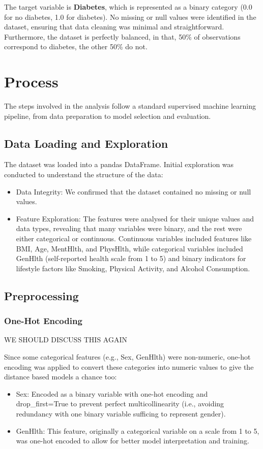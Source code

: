 \documentclass[a4paper,12pt]{article}
\begin{document}
The target variable is \textbf{Diabetes}, which is represented as a binary category 
(0.0 for no diabetes, 1.0 for diabetes). No missing or null values were identified in the dataset, 
ensuring that data cleaning was minimal and straightforward. Furthermore, the dataset is perfectly 
balanced, in that, 50\% of observations correspond to diabetes, the other 50\% do not.



\section{Process}
The steps involved in the analysis follow a standard supervised machine learning pipeline, 
from data preparation to model selection and evaluation.

\subsection{Data Loading and Exploration}
The dataset was loaded into a pandas DataFrame. Initial exploration was conducted to understand 
the structure of the data:
\begin{itemize}
    \item Data Integrity: We confirmed that the dataset contained no missing or null values.
    \item Feature Exploration: The features were analysed for their unique values and data 
    types, revealing that many variables were binary, and the rest were either categorical or 
    continuous. Continuous variables included features like BMI, Age, MentHlth, and PhysHlth, 
    while categorical variables included GenHlth (self-reported health scale from 1 to 5) 
    and binary indicators for lifestyle factors like Smoking, Physical Activity, and Alcohol 
    Consumption.
\end{itemize}

\subsection{Preprocessing}
\subsubsection{One-Hot Encoding}
WE SHOULD DISCUSS THIS AGAIN

Since some categorical features (e.g., Sex, GenHlth) were non-numeric, one-hot encoding was 
applied to convert these categories into numeric values to give the distance based models a chance too:
\begin{itemize}
    \item Sex: Encoded as a binary variable with one-hot encoding and drop\_first=True to prevent
    perfect multicollinearity (i.e., avoiding redundancy with one binary variable sufficing to 
    represent gender).
    \item GenHlth: This feature, originally a categorical variable on a scale from 1 to 5, 
    was one-hot encoded to allow for better model interpretation and training.
\end{itemize}
\end{document}
